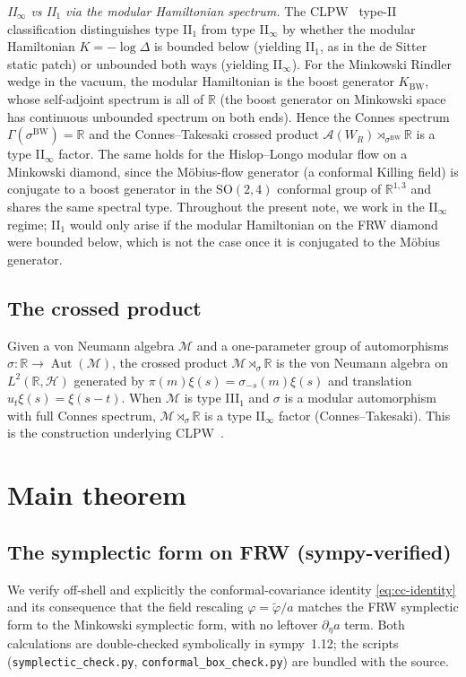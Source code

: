 \documentclass[11pt]{article}
\theoremstyle{definition}
\newcommand{\R}{\mathbb{R}}
\newcommand{\HH}{\mathcal{H}}
\renewcommand{\AA}{\mathcal{A}}
\newcommand{\MM}{\mathcal{M}}
\newcommand{\Aut}{\operatorname{Aut}}
\newcommand{\BW}{\mathrm{BW}}
\begin{document}
\noindent\emph{II$_\infty$ vs II$_1$ via the modular Hamiltonian spectrum.} The CLPW~\cite{CLPW2023} type-II classification distinguishes type II$_1$ from type II$_\infty$ by whether the modular Hamiltonian $K=-\log\Delta$ is bounded below (yielding II$_1$, as in the de Sitter static patch) or unbounded both ways (yielding II$_\infty$). For the Minkowski Rindler wedge in the vacuum, the modular Hamiltonian is the boost generator $K_\BW$, whose self-adjoint spectrum is all of $\R$ (the boost generator on Minkowski space has continuous unbounded spectrum on both ends). Hence the Connes spectrum $\Gamma(\sigma^\BW)=\R$ and the Connes--Takesaki crossed product $\AA(W_R)\rtimes_{\sigma^\BW}\R$ is a type II$_\infty$ factor. The same holds for the Hislop--Longo modular flow on a Minkowski diamond, since the M\"obius-flow generator (a conformal Killing field) is conjugate to a boost generator in the $\mathrm{SO}(2,4)$ conformal group of $\R^{1,3}$ and shares the same spectral type. Throughout the present note, we work in the II$_\infty$ regime; II$_1$ would only arise if the modular Hamiltonian on the FRW diamond were bounded below, which is not the case once it is conjugated to the M\"obius generator.

\subsection{The crossed product}\label{sec:crossed}

Given a von Neumann algebra $\MM$ and a one-parameter group of automorphisms $\sigma:\R\to\Aut(\MM)$, the crossed product $\MM\rtimes_\sigma \R$ is the von Neumann algebra on $L^2(\R, \HH)$ generated by $\pi(m)\xi(s) = \sigma_{-s}(m)\xi(s)$ and translation $u_t \xi(s) = \xi(s-t)$. When $\MM$ is type III$_1$ and $\sigma$ is a modular automorphism with full Connes spectrum, $\MM\rtimes_\sigma\R$ is a type II$_\infty$ factor (Connes--Takesaki). This is the construction underlying CLPW~\cite{CLPW2023, Witten2022}.

\section{Main theorem}\label{sec:main}

\subsection{The symplectic form on FRW (sympy-verified)}\label{sec:symplectic}

We verify off-shell and explicitly the conformal-covariance identity \eqref{eq:cc-identity} and its consequence that the field rescaling $\varphi=\tilde\varphi/a$ matches the FRW symplectic form to the Minkowski symplectic form, with no leftover $\partial_\eta a$ term. Both calculations are double-checked symbolically in sympy~1.12; the scripts (\texttt{symplectic\_check.py}, \texttt{conformal\_box\_check.py}) are bundled with the source.
\end{document}
